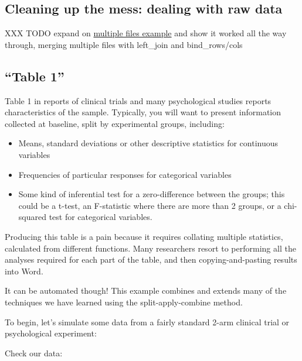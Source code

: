 \documentclass[]{article}
\providecommand{\tightlist}{%
  \setlength{\itemsep}{0pt}\setlength{\parskip}{0pt}}
\theoremstyle{definition}
\theoremstyle{definition}
\theoremstyle{definition}
\theoremstyle{remark}
\begin{document}
\subsection*{Cleaning up the mess: dealing with raw
data}\label{raw-data-mess}

XXX TODO expand on \protect\hyperlink{multiple-raw-data-files}{multiple
files example} and show it worked all the way through, merging multiple
files with left\_join and bind\_rows/cols

\subsection*{\texorpdfstring{``Table 1''}{Table 1}}\label{table1}

Table 1 in reports of clinical trials and many psychological studies
reports characteristics of the sample. Typically, you will want to
present information collected at baseline, split by experimental groups,
including:

\begin{itemize}
\tightlist
\item
  Means, standard deviations or other descriptive statistics for
  continuous variables
\item
  Frequencies of particular responses for categorical variables
\item
  Some kind of inferential test for a zero-difference between the
  groups; this could be a t-test, an F-statistic where there are more
  than 2 groups, or a chi-squared test for categorical variables.
\end{itemize}

Producing this table is a pain because it requires collating multiple
statistics, calculated from different functions. Many researchers resort
to performing all the analyses required for each part of the table, and
then copying-and-pasting results into Word.

It can be automated though! This example combines and extends many of
the techniques we have learned using the split-apply-combine method.

To begin, let's simulate some data from a fairly standard 2-arm clinical
trial or psychological experiment:

Check our data:
\end{document}
